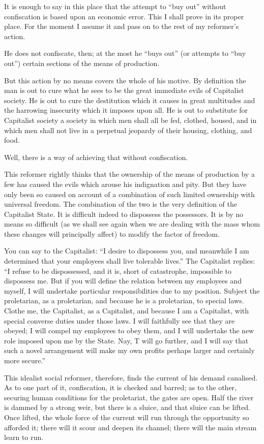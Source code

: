 \documentclass{book}
\begin{document}
It is enough to say in this place that the attempt to “buy out” without confiscation is based upon an economic error. This I shall prove in its proper place. For the moment I assume it and pass on to the rest of my reformer’s action.

He does not confiscate, then; at the most he “buys out” (or attempts to “buy out”) certain sections of the means of production.

But this action by no means covers the whole of his motive. By definition the man is out to cure what he sees to be the great immediate evils of Capitalist society. He is out to cure the destitution which it causes in great multitudes and the harrowing insecurity which it imposes upon all. He is out to substitute for Capitalist society a society in which men shall all be fed, clothed, housed, and in which men shall not live in a perpetual jeopardy of their housing, clothing, and food.

Well, there is a way of achieving that without confiscation.

This reformer rightly thinks that the ownership of the means of production by a few has caused the evils which arouse his indignation and pity. But they have only been so caused on account of a combination of such limited ownership with universal freedom. The combination of the two is the very definition of the Capitalist State. It is difficult indeed to dispossess the possessors. It is by no means so difficult (as we shall see again when we are dealing with the mass whom these changes will principally affect) to modify the factor of freedom.

You can say to the Capitalist: “I desire to dispossess you, and meanwhile I am determined that your employees shall live tolerable lives.” The Capitalist replies: “I refuse to be dispossessed, and it is, short of catastrophe, impossible to dispossess me. But if you will define the relation between my employees and myself, I will undertake particular responsibilities due to my position. Subject the proletarian, as a proletarian, and because he is a proletarian, to special laws. Clothe me, the Capitalist, as a Capitalist, and because I am a Capitalist, with special converse duties under those laws. I will faithfully see that they are obeyed; I will compel my employees to obey them, and I will undertake the new role imposed upon me by the State. Nay, T will go further, and I will say that such a novel arrangement will make my own profits perhaps larger and certainly more secure.”

This idealist social reformer, therefore, finds the current of his demand canalised. As to one part of it, confiscation, it is checked and barred; as to the other, securing human conditions for the proletariat, the gates are open. Half the river is dammed by a strong weir, but there is a sluice, and that sluice can be lifted. Once lifted, the whole force of the current will run through the opportunity so afforded it; there will it scour and deepen its channel; there will the main stream learn to run.
\end{document}
